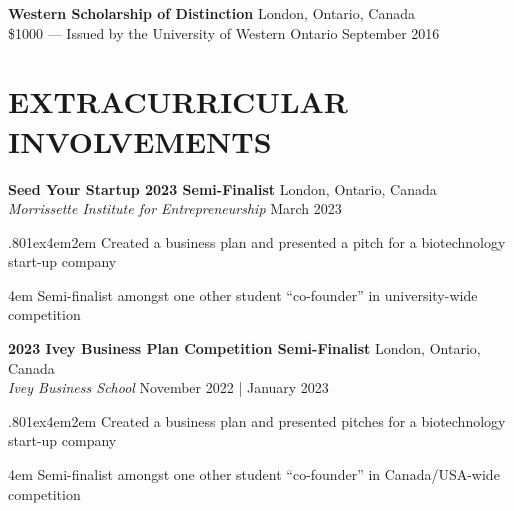 \documentclass[a4paper,9pt]{extarticle}
\begin{document}
\noindent
\begin{minipage}{1\textwidth}
\setlength{\parindent}{15pt} %
	\noindent
	\textbf{Western Scholarship of Distinction}  \hfill London, Ontario, Canada\\ 
	\$1000 --- Issued by the University of Western Ontario \hfill September 2016
\end{minipage}

\section*{EXTRACURRICULAR INVOLVEMENTS}
\noindent
\begin{minipage}{1\textwidth}
\setlength{\parindent}{15pt} %
	\noindent
	\textbf{Seed Your Startup 2023 Semi-Finalist} \hfill London, Ontario, Canada\\ %
	\textit{Morrissette Institute for Entrepreneurship} \hfill March 2023  \par%
	{\hsize.80\linewidth\parskip1ex\hangindent4em\parindent2em 
	\setlength{\parskip}{0pt} %
		\indent Created a business plan and presented a pitch for a biotechnology start-up company \par
		\hangindent4em
		\indent Semi-finalist amongst one other student “co-founder” in university-wide competition \par}
\end{minipage}
\vspace{\parskip}

\noindent
\begin{minipage}{1\textwidth}
\setlength{\parindent}{15pt} %
	\noindent
	\textbf{2023 Ivey Business Plan Competition Semi-Finalist} \hfill London, Ontario, Canada\\ %
	\textit{Ivey Business School} \hfill November 2022 | January 2023  \par%
	{\hsize.80\linewidth\parskip1ex\hangindent4em\parindent2em 
	\setlength{\parskip}{0pt} %
		\indent Created a business plan and presented pitches for a biotechnology start-up company \par
		\hangindent4em
		\indent Semi-finalist amongst one other student “co-founder” in Canada/USA-wide competition \par}
\end{minipage}
\vspace{\parskip}
\end{document}
